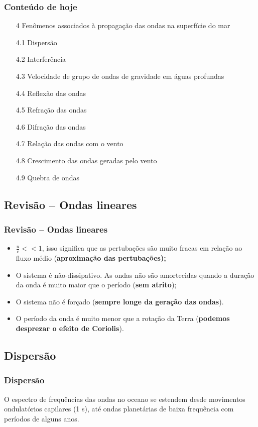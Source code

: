 \begin{frame}
\frametitle{Conteúdo de hoje}
{\footnotesize
  \begin{itemize}[<+-| alert@+>]
    \item[4] Fenômenos associados à propagação das ondas na superfície do mar
    \item[4.1] Dispersão
    \item[4.2] Interferência
    \item[4.3] Velocidade de grupo de ondas de gravidade em águas profundas
    \item[4.4] Reflexão das ondas
    \item[4.5] Refração das ondas
    \item[4.6] Difração das ondas
    \item[4.7] Relação das ondas com o vento
    \item[4.8] Crescimento das ondas geradas pelo vento
    \item[4.9] Quebra de ondas
  \end{itemize}
  }
\end{frame}


\subsection{Revisão -- Ondas lineares}
\begin{frame}
\frametitle{Revisão -- Ondas lineares}
  \begin{itemize}[<+-| alert@+>]
    \item $\frac{u}{c} << 1$, isso significa que as pertubações são muito
          fracas em relação ao fluxo médio (\bf{aproximação das pertubações});
    \item O sistema é não-dissipativo.  As ondas não são amortecidas quando a
          duração da onda é muito maior que o período ({\bf sem atrito});
    \item O sistema não é forçado ({\bf sempre longe da geração das ondas}).
    \item O período da onda é muito menor que a rotação da Terra ({\bf podemos desprezar o efeito de Coriolis}).
  \end{itemize}

\end{frame}


\subsection{Dispersão}
\begin{frame}
\frametitle{Dispersão}
    \begin{block}{}
    O espectro de frequências das ondas no oceano se estendem desde movimentos
    ondulatórios capilares (1 s), até ondas planetárias de baixa frequência
    com períodos de alguns anos.
    \end{block}
\end{frame}


